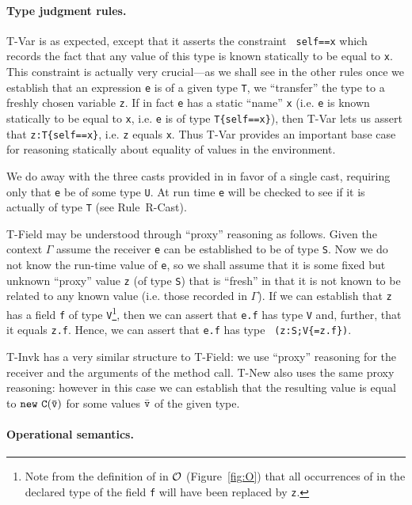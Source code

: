 \paragraph{Type judgment rules.}
{\sc T-Var} is as expected, except that it asserts the constraint {\tt
self==x} which records the fact that any value of this type is known
statically to be equal to {\tt x}. This constraint is actually very
crucial---as we shall see in the other rules once we establish that
an expression {\tt e} is of a given type {\tt T}, we ``transfer'' the
type to a freshly chosen variable {\tt z}. If in fact {\tt e} has a
static ``name'' {\tt x} (i.e.{} {\tt e} is known statically to be
equal to {\tt x}, i.e.{} {\tt e} is of type {\tt T\{self==x\}}), then
{\sc T-Var} lets us assert that {\tt z:T\{self==x\}}, i.e.{} {\tt z}
equals {\tt x}. Thus {\sc T-Var} provides an important base case for
reasoning statically about equality of values in the environment.

We do away with the three casts provided in\FJ{} in favor of a single
cast, requiring only that {\tt e} be of some type {\tt U}. At run time
{\tt e} will be checked to see if it is actually of type {\tt T} (see
Rule~{\sc R-Cast}).

{\sc T-Field} may be understood through ``proxy'' reasoning as
follows.  Given the context $\Gamma$ assume the receiver {\tt e} can
be established to be of type {\tt S}. Now we do not know the run-time
value of {\tt e}, so we shall assume that it is some fixed but unknown
``proxy'' value {\tt z} (of type {\tt S}) that is ``fresh'' in that it
is not known to be related to any known value (i.e.{} those recorded
in $\Gamma$).  If we can establish that {\tt z} has a field {\tt f} of
type {\tt V}\footnote{Note from the definition of
\fields{} in ${\cal O}$ (Figure~\ref{fig:O}) that all occurrences of
\this{} in the declared type of the field {\tt f} will have been replaced
by {\tt z}.}, then we can assert that
{\tt e.f} has type {\tt V} and, further, that it equals {\tt z.f}.
Hence, we can assert that {\tt e.f} has type {\tt
(z:S;V\{\self=z.f\})}.

{\sc T-Invk} has a very similar structure to {\sc T-Field}: we use
``proxy'' reasoning for the receiver and the arguments of the method
call. {\sc T-New} also uses the same proxy reasoning: however in this case
we can establish that the resulting value is equal to ${\tt new\ C(\bar{\tt v})}$
for some values $\bar{\tt v}$ of the given type.

\paragraph{Operational semantics.}

